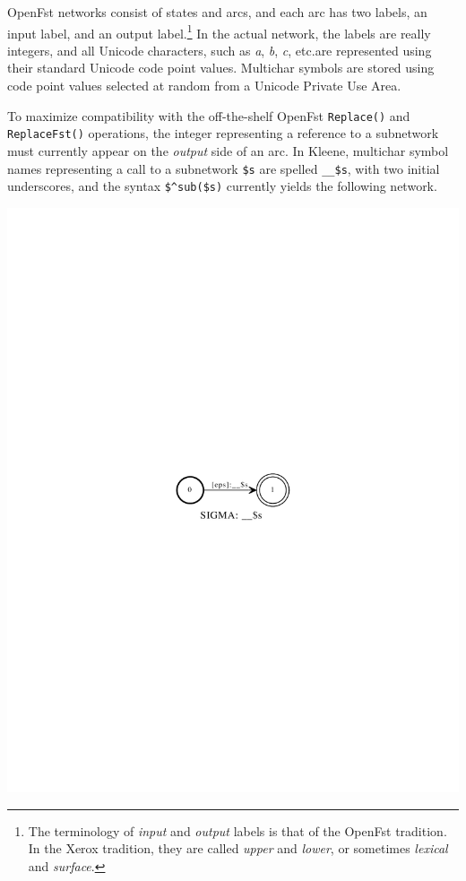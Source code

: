 OpenFst networks consist of states and arcs, and each arc has two labels,
an input label, and an output label.\footnote{The terminology of
\emph{input} and \emph{output} labels is that of the OpenFst tradition.
In the Xerox tradition, they are called \emph{upper} and \emph{lower}, or
sometimes \emph{lexical} and \emph{surface}.}  In the actual network, the
labels are really integers, and all Unicode characters, such as \emph{a},
\emph{b}, \emph{c}, etc.\@ are represented using their standard Unicode
code point values.  Multichar symbols are stored using code point values
selected at random from a Unicode Private Use Area.

To maximize compatibility with the off-the-shelf OpenFst
\texttt{Replace()} and \texttt{ReplaceFst()} operations, the integer
representing a reference to a subnetwork must currently appear on the
\emph{output} side of an arc.  In Kleene, multichar symbol names
representing a call to a subnetwork \verb!$s! are spelled \verb!__$s!,
with two initial underscores, and the syntax \verb!$^sub($s)!  currently
yields the following network.

\begin{center}
\includegraphics{images/reference.pdf}
\end{center}

